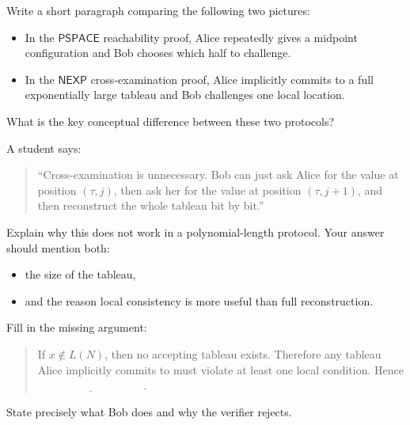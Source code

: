 \documentclass[11pt]{article}
\begin{document}
\begin{exercise}
\label{ex:compare-pspace-and-nexp-intuitions}
Write a short paragraph comparing the following two pictures:

\begin{itemize}
    \item In the \(\mathsf{PSPACE}\) reachability proof, Alice repeatedly gives a midpoint configuration and Bob chooses which half to challenge.
    \item In the \(\mathsf{NEXP}\) cross-examination proof, Alice implicitly commits to a full exponentially large tableau and Bob challenges one local location.
\end{itemize}

What is the key conceptual difference between these two protocols?
\end{exercise}

\begin{exercise}
\label{ex:find-the-flaw}
A student says:

\begin{quote}
``Cross-examination is unnecessary. Bob can just ask Alice for the value at position \((\tau,j)\), then ask her for the value at position \((\tau,j+1)\), and then reconstruct the whole tableau bit by bit.''
\end{quote}

Explain why this does not work in a polynomial-length protocol. Your answer should mention both:
\begin{itemize}
    \item the size of the tableau,
    \item and the reason local consistency is more useful than full reconstruction.
\end{itemize}
\end{exercise}

\begin{exercise}
\label{ex:mini-proof-exercise}
Fill in the missing argument:

\begin{quote}
If \(x\notin L(N)\), then no accepting tableau exists. Therefore any tableau Alice implicitly commits to must violate at least one local condition. Hence \(\underline{\hspace{4cm}}\).
\end{quote}

State precisely what Bob does and why the verifier rejects.
\end{exercise}
\end{document}
